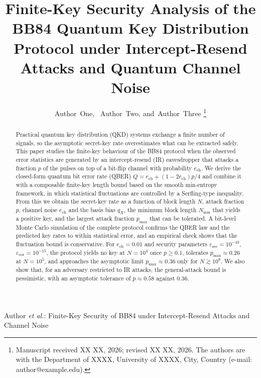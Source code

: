 \documentclass[journal]{IEEEtran}
\newcommand{\epssec}{\varepsilon_{\mathrm{sec}}}
\newcommand{\epscor}{\varepsilon_{\mathrm{cor}}}
\newcommand{\ech}{e_{\mathrm{ch}}}
\newcommand{\Nmin}{N_{\min}}
\begin{document}
\title{Finite-Key Security Analysis of the BB84 Quantum Key Distribution Protocol under Intercept-Resend Attacks and Quantum Channel Noise}

\author{Author~One,~
        Author~Two,
        and~Author~Three%
\thanks{Manuscript received XX XX, 2026; revised XX XX, 2026.
The authors are with the Department of XXXX, University of XXXX, City, Country
(e-mail: author@example.edu).}}

%
{Author \MakeLowercase{\textit{et al.}}: Finite-Key Security of BB84 under Intercept-Resend Attacks and Channel Noise}

\maketitle

\begin{abstract}
Practical quantum key distribution (QKD) systems exchange a finite number of signals, so the asymptotic secret-key rate overestimates what can be extracted safely. This paper studies the finite-key behaviour of the BB84 protocol when the observed error statistics are generated by an intercept-resend (IR) eavesdropper that attacks a fraction $p$ of the pulses on top of a bit-flip channel with probability $\ech$. We derive the closed-form quantum bit error rate (QBER) $Q=\ech+(1-2\ech)p/4$ and combine it with a composable finite-key length bound based on the smooth min-entropy framework, in which statistical fluctuations are controlled by a Serfling-type inequality. From this we obtain the secret-key rate as a function of block length $N$, attack fraction $p$, channel noise $\ech$ and the basis bias $q_X$, the minimum block length $\Nmin$ that yields a positive key, and the largest attack fraction $p_{\max}$ that can be tolerated. A bit-level Monte Carlo simulation of the complete protocol confirms the QBER law and the predicted key rates to within statistical error, and an empirical check shows that the fluctuation bound is conservative. For $\ech=0.01$ and security parameters $\epssec=10^{-10}$, $\epscor=10^{-15}$, the protocol yields no key at $N=10^4$ once $p\ge 0.1$, tolerates $p_{\max}\approx0.26$ at $N=10^5$, and approaches the asymptotic limit $p_{\max}\approx0.36$ only for $N\gtrsim 10^8$. We also show that, for an adversary restricted to IR attacks, the general-attack bound is pessimistic, with an asymptotic tolerance of $p\approx0.58$ against $0.36$.
\end{abstract}
\end{document}
